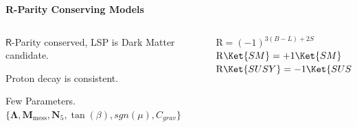 \documentclass{beamer}
\begin{document}
\begin{frame}
  \textcolor{UMN@Maroon}{\textbf{\huge{R-Parity Conserving Models}}}   
\begin{minipage}[b]{0.90\paperwidth}
  \begin{columns}
    \begin{column}{0.50\linewidth} 
           \begin{itemize}
           \large{
             \item $\mathsf{R}$-Parity conserved, LSP is Dark Matter candidate. 
             \item Proton decay is consistent.
             \item Few Parameters.\\
             $\{ \mathbf{\Lambda},\mathbf{M}_{\mbox{mess}}, \mathbf{N}_{5}, \tan(\beta),  sgn(\mu), C_{grav} \} $ 
              
             }
           \end{itemize}                    
     \end{column}%
     \hspace{0.5cm}
     \begin{column}{0.43\linewidth} 
              $ \mathrm{R} = (-1)^{3(B-L) + 2S} $ \\
              $\mathrm{R}\Ket{SM} = +1\Ket{SM} $ \\
              $ \mathrm{R}\Ket{SUSY}  = -1\Ket{SUSY} $ \\             
     \end{column}
   \end{columns} 
      
\end{minipage}
\end{frame}
\end{document}
